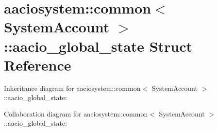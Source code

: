 \hypertarget{structaaciosystem_1_1common_1_1aacio__global__state}{}\section{aaciosystem\+:\+:common$<$ System\+Account $>$\+:\+:aacio\+\_\+global\+\_\+state Struct Reference}
\label{structaaciosystem_1_1common_1_1aacio__global__state}


Inheritance diagram for aaciosystem\+:\+:common$<$ System\+Account $>$\+:\+:aacio\+\_\+global\+\_\+state\+:


Collaboration diagram for aaciosystem\+:\+:common$<$ System\+Account $>$\+:\+:aacio\+\_\+global\+\_\+state\+:
